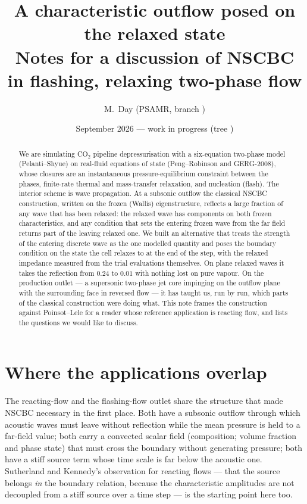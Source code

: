 \documentclass[11pt,a4paper]{article}
\title{A characteristic outflow posed on the relaxed state\\
\large Notes for a discussion of NSCBC in flashing, relaxing two-phase flow}
\author{M.~Day \quad (PSAMR, branch \code{co2-eos})}
\date{September 2026 --- work in progress (tree \code{7abcc31})}
\begin{document}
\maketitle

\begin{abstract}
\noindent
We are simulating CO$_2$ pipeline depressurisation with a six-equation
two-phase model (Pelanti--Shyue) on real-fluid equations of state
(Peng--Robinson and GERG-2008), whose closures are an instantaneous
pressure-equilibrium constraint between the phases, finite-rate thermal
and mass-transfer relaxation, and nucleation (flash).  The
interior scheme is wave propagation.  At a subsonic outflow the
classical NSCBC construction, written on the frozen (Wallis)
eigenstructure, reflects a large fraction of any wave that has been
relaxed: the relaxed wave has components on both frozen
characteristics, and any condition that sets the entering frozen wave
from the far field returns part of the leaving relaxed one.  We built an
alternative that treats the strength of the entering discrete wave as
the one modelled quantity and poses the boundary condition on the state
the cell relaxes to at the end of the step, with the relaxed impedance
measured from the trial evaluations themselves.  On plane relaxed waves
it takes the reflection from $0.24$ to $0.01$ with nothing lost on pure
vapour.  On the production outlet --- a supersonic two-phase jet core
impinging on the outflow plane with the surrounding face in reversed
flow --- it has taught us, run by run, which parts of the classical
construction were doing what.  This note frames the construction against
Poinsot--Lele for a reader whose reference application is reacting flow,
and lists the questions we would like to discuss.
\end{abstract}

\section{Where the applications overlap}

The reacting-flow and the flashing-flow outlet share the structure that
made NSCBC necessary in the first place.  Both have a subsonic outflow
through which acoustic waves must leave without reflection while the
mean pressure is held to a far-field value; both carry a convected
scalar field (composition; volume fraction and phase state) that must
cross the boundary without generating pressure; both have a stiff source
term whose time scale is far below the acoustic one.  Sutherland and
Kennedy's observation for reacting flows --- that the source belongs
\emph{in} the boundary relation, because the characteristic amplitudes
are not decoupled from a stiff source over a time step --- is the
starting point here too.
\end{document}
